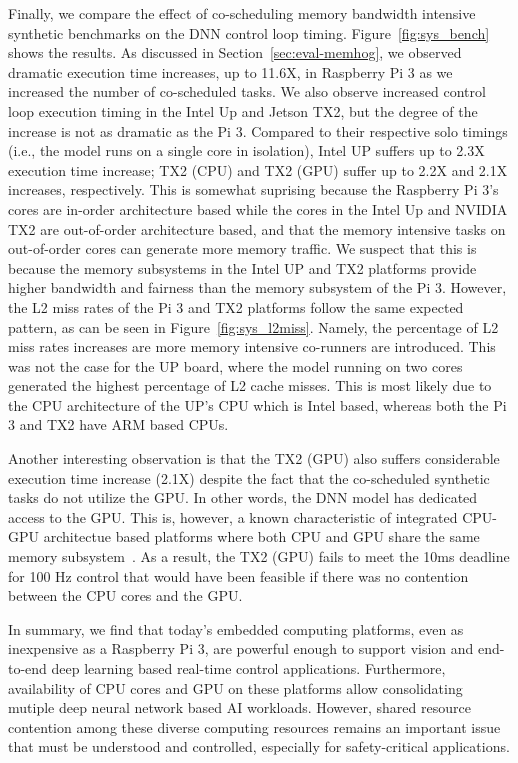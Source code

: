 Finally, we compare the effect of co-scheduling memory bandwidth
intensive synthetic benchmarks on the DNN control loop timing. 
Figure~\ref{fig:sys_bench} shows the results.
As discussed in 
Section~\ref{sec:eval-memhog}, we observed dramatic execution time
increases, up to 11.6X, in Raspberry Pi 3 as we increased the number of
co-scheduled tasks. We also observe increased control loop execution
timing in the Intel Up and Jetson TX2, but the degree of the increase is 
not as dramatic as the Pi 3. Compared to their respective solo timings 
(i.e., the model runs on a single core in isolation), Intel UP suffers up to
2.3X execution time increase; TX2 (CPU) and TX2 (GPU) suffer up to
2.2X and 2.1X increases, respectively. This is somewhat suprising
because the Raspberry Pi 3's cores are in-order architecture based while
the cores in the Intel Up and NVIDIA TX2 are out-of-order architecture
based, and that the memory intensive tasks on out-of-order cores can
generate more memory traffic. We suspect that this is because the
memory subsystems in the Intel UP and TX2 platforms provide higher
bandwidth and fairness than the memory subsystem of the Pi 3. However, 
the L2 miss rates of the Pi 3 and TX2 platforms follow the same expected 
pattern, as can be seen in Figure~\ref{fig:sys_l2miss}. Namely, the 
percentage of L2 miss rates increases are more 
memory intensive co-runners are introduced. This was not the case for 
the UP board, where the model running on two cores generated the highest
percentage of L2 cache misses. This is most likely due to the CPU 
architecture of the UP's CPU which is Intel based, whereas both the Pi 3
and TX2 have ARM based CPUs.

Another interesting observation is that the TX2 (GPU) also suffers
considerable execution time increase (2.1X) despite the fact that the
co-scheduled synthetic tasks do not utilize the GPU. In other words,
the DNN model has dedicated access to the GPU. This is, however, a
known characteristic of integrated CPU-GPU architectue based
platforms where both CPU and GPU share the same memory
subsystem~\cite{Ali2017}. As a result, the TX2 (GPU) fails to meet the
10ms deadline for 100 Hz control that would have been feasible if
there was no contention between the CPU cores and the GPU.

In summary, we find that today's embedded computing platforms, even as
inexpensive as a Raspberry Pi 3, are powerful enough to support
vision and end-to-end deep learning based real-time control
applications. Furthermore, availability of CPU cores and GPU on these
platforms allow consolidating mutiple deep neural network based AI
workloads. However, shared resource contention among these diverse
computing resources remains an important issue that must be understood
and controlled, especially for safety-critical applications.
